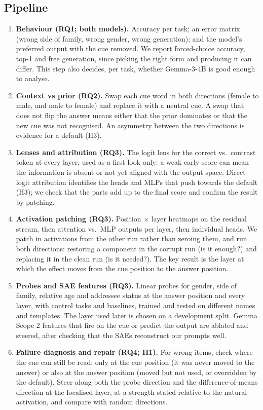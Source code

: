 \documentclass[11pt,a4paper]{article}
\begin{document}
\subsection{Pipeline}

\begin{enumerate}[leftmargin=1.4em,itemsep=0.35em]
  \item \textbf{Behaviour (RQ1; both models).} Accuracy per task; an error matrix (wrong side of family, wrong gender, wrong generation); and the model's preferred output with the cue removed. We report forced-choice accuracy, top-1 and free generation, since picking the right form and producing it can differ. This step also decides, per task, whether Gemma-3-4B is good enough to analyse.
  \item \textbf{Context vs prior (RQ2).} Swap each cue word in both directions (female to male, and male to female) and replace it with a neutral cue. A swap that does not flip the answer means either that the prior dominates or that the new cue was not recognised. An asymmetry between the two directions is evidence for a default (H3).
  \item \textbf{Lenses and attribution (RQ3).} The logit lens for the correct vs.\ contrast token at every layer, used as a first look only: a weak early score can mean the information is absent or not yet aligned with the output space. Direct logit attribution identifies the heads and MLPs that push towards the default (H3); we check that the parts add up to the final score and confirm the result by patching.
  \item \textbf{Activation patching (RQ3).} Position $\times$ layer heatmaps on the residual stream, then attention vs.\ MLP outputs per layer, then individual heads. We patch in activations from the other run rather than zeroing them, and run both directions: restoring a component in the corrupt run (is it enough?) and replacing it in the clean run (is it needed?). The key result is the layer at which the effect moves from the cue position to the answer position.
  \item \textbf{Probes and SAE features (RQ3).} Linear probes for gender, side of family, relative age and addressee status at the answer position and every layer, with control tasks and baselines, trained and tested on different names and templates. The layer used later is chosen on a development split. Gemma Scope 2 features that fire on the cue or predict the output are ablated and steered, after checking that the SAEs reconstruct our prompts well.
  \item \textbf{Failure diagnosis and repair (RQ4; H1).} For wrong items, check where the cue can still be read: only at the cue position (it was never moved to the answer) or also at the answer position (moved but not used, or overridden by the default). Steer along both the probe direction and the difference-of-means direction at the localised layer, at a strength stated relative to the natural activation, and compare with random directions.

\end{enumerate}
\end{document}
